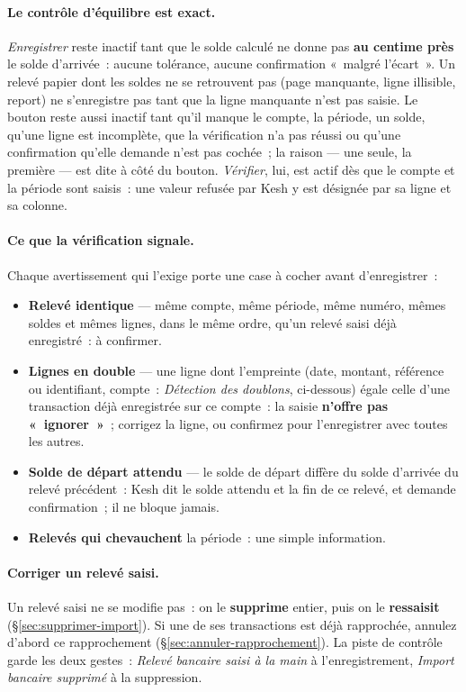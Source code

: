 \documentclass[a4paper,11pt,oneside]{article}
\begin{document}
\paragraph{Le contrôle d'équilibre est exact.} \emph{Enregistrer} reste inactif tant que le solde
calculé ne donne pas \textbf{au centime près} le solde d'arrivée~: aucune tolérance, aucune
confirmation «~malgré l'écart~». Un relevé papier dont les soldes ne se retrouvent pas (page
manquante, ligne illisible, report) ne s'enregistre pas tant que la ligne manquante n'est pas
saisie. Le bouton reste aussi inactif tant qu'il manque le compte, la période, un solde, qu'une
ligne est incomplète, que la vérification n'a pas réussi ou qu'une confirmation qu'elle demande
n'est pas cochée~; la raison --- une seule, la première --- est dite à côté du bouton.
\emph{Vérifier}, lui, est actif dès que le compte et la période sont saisis~: une valeur refusée
par Kesh y est désignée par sa ligne et sa colonne.

\paragraph{Ce que la vérification signale.} Chaque avertissement qui l'exige porte une case à
cocher avant d'enregistrer~:
\begin{itemize}
    \item \textbf{Relevé identique} --- même compte, même période, même numéro, mêmes soldes et
          mêmes lignes, dans le même ordre, qu'un relevé saisi déjà enregistré~: à confirmer.
    \item \textbf{Lignes en double} --- une ligne dont l'empreinte (date, montant, référence ou
          identifiant, compte~: \emph{Détection des doublons}, ci-dessous) égale celle d'une
          transaction déjà enregistrée sur ce compte~: la saisie \textbf{n'offre pas
          «~ignorer~»}~; corrigez la ligne, ou confirmez pour l'enregistrer avec toutes les
          autres.
    \item \textbf{Solde de départ attendu} --- le solde de départ diffère du solde d'arrivée du
          relevé précédent~: Kesh dit le solde attendu et la fin de ce relevé, et demande
          confirmation~; il ne bloque jamais.
    \item \textbf{Relevés qui chevauchent} la période~: une simple information.
\end{itemize}

\paragraph{Corriger un relevé saisi.} Un relevé saisi ne se modifie pas~: on le
\textbf{supprime} entier, puis on le \textbf{ressaisit} (\S\ref{sec:supprimer-import}). Si une
de ses transactions est déjà rapprochée, annulez d'abord ce rapprochement
(\S\ref{sec:annuler-rapprochement}). La piste de contrôle garde les deux gestes~: \emph{Relevé
bancaire saisi à la main} à l'enregistrement, \emph{Import bancaire supprimé} à la suppression.
\end{document}
